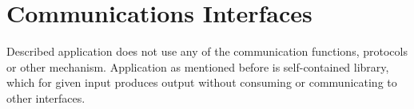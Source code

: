 \section{Communications Interfaces}
	\begin{comment}
		$<$Describe the requirements associated with any communications functions 
		required by this product, including e-mail, web browser, network server 
		communications protocols, electronic forms, and so on. Define any pertinent 
		message formatting. Identify any communication standards that will be used, such 
		as FTP or HTTP. Specify any communication security or encryption issues, data 
		transfer rates, and synchronization mechanisms.$>$
	\end{comment}
	
	Described application does not use any of the communication functions, protocols or other mechanism. Application as mentioned before is self-contained library, which for given input produces output without consuming or communicating to other interfaces.